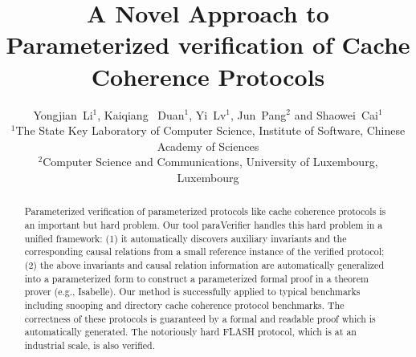 \documentclass[conference]{IEEEtran}
\newcommand\redt[1]{\textcolor{red}{#1} }
\begin{document}
\title{ {\sf A Novel Approach to Parameterized verification of Cache Coherence Protocols}
}


\author{Yongjian~Li$^1$, Kaiqiang~ Duan$^1$, Yi~Lv$^1$, Jun~Pang$^2$ and Shaowei~Cai$^1$\\
${^1}$The  State Key Laboratory of Computer Science,  Institute of Software,
 Chinese Academy of Sciences    \\
${^2}$Computer Science and Communications, University of Luxembourg, Luxembourg  } 

\maketitle
\vspace{-3cm}
\begin{abstract}
Parameterized verification of parameterized protocols like cache coherence protocols is an important but hard problem.  Our tool {\sf paraVerifier} handles this hard problem in
a unified framework: (1) it automatically  discovers auxiliary invariants and the
corresponding causal relations %
 from a small reference instance of the verified protocol; (2) the above
invariants and causal relation information  are automatically generalized into a parameterized
form to construct a parameterized formal proof in a theorem prover
(e.g., Isabelle). %
Our method is successfully applied to typical
benchmarks including   snooping and directory cache coherence protocol benchmarks. The correctness of these protocols is guaranteed  by a formal and readable proof which is automatically generated. The notoriously hard FLASH protocol, which is at an industrial scale, is also verified.

\end{abstract}
\end{document}
